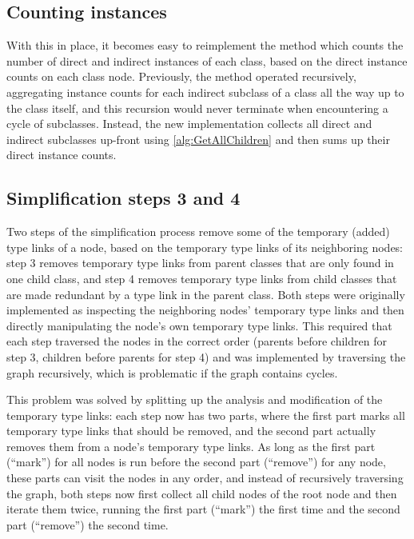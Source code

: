 \subsection{Counting instances}
\label{subsec:RDF2Graph+Wikidata:cyclic-graphs:count-instances}

With this in place,
it becomes easy to reimplement the method which counts the number of direct and indirect instances of each class,
based on the direct instance counts on each class node.
Previously, the method operated recursively,
aggregating instance counts for each indirect subclass of a class
all the way up to the class itself,
and this recursion would never terminate when encountering a cycle of subclasses.
Instead, the new implementation collects all direct and indirect subclasses up-front using \cref{alg:GetAllChildren}
and then sums up their direct instance counts.

\subsection{Simplification steps 3 and 4}
\label{subsec:RDF2Graph+Wikidata:cyclic-graphs:simplify-step-3+4}

Two steps of the simplification process
remove some of the temporary (added) \glspl{type link} of a node,
based on the temporary \glspl{type link} of its neighboring nodes:
step 3 removes temporary \glspl{type link} from parent classes that are only found in one child class,
and step 4 removes temporary \glspl{type link} from child classes that are made redundant by a \gls{type link} in the parent class.
Both steps were originally implemented as inspecting the neighboring nodes’ temporary \glspl{type link}
and then directly manipulating the node’s own temporary \glspl{type link}.
This required that each step traversed the nodes in the correct order
(parents before children for step 3,
children before parents for step 4)
and was implemented by traversing the graph recursively,
which is problematic if the graph contains cycles.

This problem was solved by splitting up the analysis and modification of the temporary \glspl{type link}:
each step now has two parts,
where the first part marks all temporary \glspl{type link} that should be removed,
and the second part actually removes them from a node’s temporary \glspl{type link}.
As long as the first part (“mark”) for all nodes is run before the second part (“remove”) for any node,
these parts can visit the nodes in any order,
and instead of recursively traversing the graph,
both steps now first collect all child nodes of the root node
and then iterate them twice,
running the first part (“mark”) the first time and the second part (“remove”) the second time.

